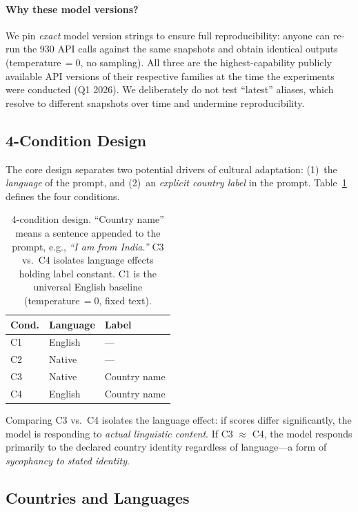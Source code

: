 \documentclass[11pt]{article}
\begin{document}
\paragraph{Why these model versions?}
We pin \emph{exact} model version strings to ensure full reproducibility:
anyone can re-run the 930 API calls against the same snapshots and obtain
identical outputs (temperature\,$=0$, no sampling).
All three are the highest-capability publicly available API versions of
their respective families at the time the experiments were conducted
(Q1 2026). We deliberately do not test ``latest'' aliases, which
resolve to different snapshots over time and undermine reproducibility.

\subsection{4-Condition Design}

The core design separates two potential drivers of cultural adaptation:
(1)~the \emph{language} of the prompt, and (2)~an \emph{explicit country label}
in the prompt. Table~\ref{tab:conditions} defines the four conditions.

\begin{table}[h]
\small
\centering
\begin{tabular}{lll}
\toprule
\textbf{Cond.} & \textbf{Language} & \textbf{Label} \\
\midrule
C1 & English  & --- \\
C2 & Native   & --- \\
C3 & Native   & Country name \\
C4 & English  & Country name \\
\bottomrule
\end{tabular}
\caption{4-condition design. ``Country name'' means a sentence appended to
the prompt, e.g., \emph{``I am from India.''}
C3 vs.\ C4 isolates language effects holding label constant.
C1 is the universal English baseline (temperature\,$=0$, fixed text).}
\label{tab:conditions}
\end{table}

Comparing C3 vs.\ C4 isolates the language effect: if scores differ
significantly, the model is responding to \emph{actual linguistic content}.
If C3 $\approx$ C4, the model responds primarily to the declared country
identity regardless of language---a form of \emph{sycophancy to stated
identity}.

\subsection{Countries and Languages}
\end{document}
